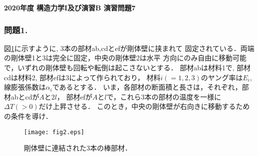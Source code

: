 \documentclass[10pt,a4j]{jarticle}
\newlength{\minitwocolumn}
\begin{document}
\newcommand{\fat}[1]{\mbox{\boldmath $#1$}}
\newcommand{\D}{\partial}
\newcommand{\w}{\omega}
\newcommand{\ga}{\alpha}
\newcommand{\gb}{\beta}
\newcommand{\gx}{\xi}
\newcommand{\gz}{\zeta}
\newcommand{\vhat}[1]{\hat{\fat{#1}}}
\newcommand{\spc}{\vspace{0.7\baselineskip}}
\newcommand{\halfspc}{\vspace{0.3\baselineskip}}

\pagestyle{empty}
\newcommand{\twofig}[2]
 {
   \begin{figure}[h]
     \begin{minipage}[t]{\minitwocolumn}
         \begin{center}   #1
         \end{center}
     \end{minipage}
         \hspace{\columnsep}
     \begin{minipage}[t]{\minitwocolumn}
         \begin{center} #2
         \end{center}
     \end{minipage}
   \end{figure}
 }
\begin{center}
{\Large \bf 2020年度 構造力学I及び演習B 演習問題7 } \\
\end{center}
\subsubsection*{問題1.}
図\ref{fig:fig2}に示すように, 3本の部材ab,cdとefが剛体壁に挟まれて
固定されている．両端の剛体壁1と3は完全に固定，中央の剛体壁2は水平
方向にのみ自由に移動可能で，いずれの剛体壁も回転や転倒は起こさないとする．
部材abは材料1で, 部材cdは材料2, 部材efは3によって作られており，
材料$i(=1,2,3)$のヤング率は$E_i$, 線膨張係数は$\alpha_i$であるとする．
いま，各部材の断面積と長さは，それぞれ，部材abとcdが$A$と$2l$，
部材efが$A$と$l$で，これら3本の部材の温度を一様に$\Delta T(>0)$だけ上昇させる．
このとき，中央の剛体壁が右向きに移動するための条件を導け．
\begin{figure}[h]
	\begin{center}
	\texttt{[image: fig2.eps]} 
	\end{center}
	\caption{剛体壁に連結された3本の棒部材．} 
	\label{fig:fig2}
\end{figure}
\end{document}
